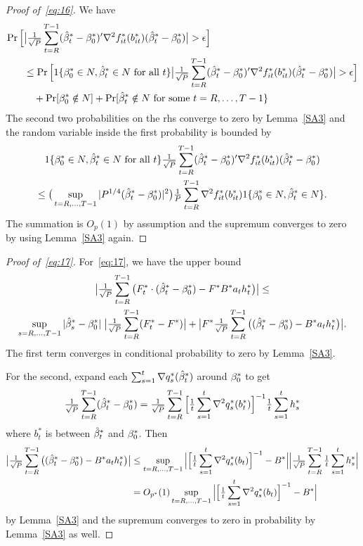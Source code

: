 \documentclass[12pt,fleqn]{article}
\begin{document}
\begin{proof}[Proof of~\eqref{eq:16}]
We have
\begin{align*}
  \pr\Big[& \big|\oclt{t} (\bh_t^* - \btrue^*)' \nabla^2 f_{it}^*(b_{it}^*) (\bh_t^* - \btrue^*) \big| > \epsilon \Big] \\
  &\leq \pr\Big[1\{\btrue^* \in N, \bh_t^* \in N\ \text{for all}\ t\} \big|\oclt{t} (\bh_t^* - \btrue^*)' \nabla^2 f_{it}^*(b_{it}^*) (\bh_t^* - \btrue^*) \big| > \epsilon \Big] \\
  &\quad + \pr[\btrue^* \notin N] + \pr[\bh_t^* \notin N\ \text{for some}\ t = R,\dots,T-1\}
\end{align*}
The second two probabilities on the rhs converge to zero by
Lemma~\ref{SA3} and the random variable inside the first probability is bounded by
\begin{multline*}
  1\{\beta_0^* \in N, \hat \beta_t^* \in N\ \text{for all}\ t\}
  \tfrac{1}{\sqrt{P}} \sum_{t=R}^{T-1} (\hat \beta_t^* - \beta_0^*)' \nabla^2 f_{it}^*(b_{it}^*) (\hat \beta_t^* - \beta_0^*)
  \\ \leq
  \big(\sup_{t=R,\dots,T-1} |P^{1/4}(\hat \beta_t^* - \beta_0^*)|^2\big) \tfrac{1}{P} \sum_{t=R}^{T-1}  \nabla^2 f_{it}^*(b_{it}^*) 1\{\beta_0^* \in N, \hat \beta_t^* \in N\}.
\end{multline*}
The summation is $O_p(1)$ by assumption and the supremum converges to
zero by using Lemma~\ref{SA3} again.
\end{proof}
\begin{proof}[Proof of~\eqref{eq:17}]
For~\eqref{eq:17}, we have the upper bound
\begin{multline*}
  \big\lvert \tfrac{1}{\sqrt{P}} \sum_{t=R}^{T-1} \big(F_t^* \cdot (\hat \beta_t^* - \beta_0^*) - F^* B^* a_t h_t^*\big) \big\rvert \leq \\
   \sup_{s=R,\dots,T-1} |\hat \beta_s^* - \beta_0^*|\; \big\lvert \tfrac{1}{\sqrt{P}} \sum_{t=R}^{T-1} (F_t^* - F^*) \big\rvert
  + \big\lvert F^* \tfrac{1}{\sqrt{P}} \sum_{t=R}^{T-1} \big((\hat \beta_t^* - \beta_0^*) - B^* a_t h_t^*\big) \big\rvert.
\end{multline*}
The first term converges in conditional probability to zero by
Lemma~\ref{SA3}.

For the second, expand each $\sum_{s=1}^t \nabla q_s^*(\hat \beta_t^*)$
around $\beta_0^*$ to get
\begin{equation*}
  \tfrac{1}{\sqrt{P}} \sum_{t=R}^{T-1} (\hat \beta_t^* - \beta_0^*)
  = \tfrac{1}{\sqrt{P}} \sum_{t=R}^{T-1} \Big[\tfrac{1}{t} \sum_{s=1}^t \nabla^2 q_s^*(b_t^*)\Big]^{-1} \tfrac{1}{t} \sum_{s=1}^t h_s^*
\end{equation*}
where $b_t^*$ is between $\hat \beta_t^*$ and $\beta_0^*$. Then
\begin{align*}
  \big\lvert \tfrac{1}{\sqrt{P}} \sum_{t=R}^{T-1} \big((\hat \beta_t^* - \beta_0^*) - B^* a_t h_t^*\big) \big\rvert
  &\leq \sup_{t=R,\dots,T-1} \Big\lvert\Big[\tfrac{1}{t} \sum_{s=1}^t \nabla^2 q_s^*(b_t)\Big]^{-1} - B^*\Big\rvert
  \Big\lvert\tfrac{1}{\sqrt{P}} \sum_{t=R}^{T-1} \tfrac{1}{t} \sum_{s=1}^t h_s^* \Big\rvert \\
  &= O_{p^*}(1) \sup_{t=R,\dots,T-1} \Big\lvert\Big[\tfrac{1}{t} \sum_{s=1}^t \nabla^2 q_s^*(b_t)\Big]^{-1} - B^*\Big\rvert
\end{align*}
by Lemma~\ref{SA3} and the supremum converges to zero in
probability by Lemma~\ref{SA3} as well.
\end{proof}
\end{document}
